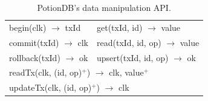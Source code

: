 \documentclass[sigplan,review,anonymous]{acmart}
\newcommand{\code}[1]{\textsf{\small{#1}}}
\begin{document}
\begin{small}
\begin{table}[t]
\center
	\begin{tabular}{ll} 
		\toprule
		 \code{begin(clk) $\rightarrow$ txId}                    & \code{get(txId, id) $\rightarrow$ value}            \\
		 \code{commit(txId) $\rightarrow$ clk}            & \code{read(txId, id, op) $\rightarrow$ value}          \\
		  \code{rollback(txId) $\rightarrow$ ok}        & \code{upsert(txId, id, op) $\rightarrow$ ok}                        \\[4pt]
		\multicolumn{2}{l}{\code{readTx(clk, (id, op)$^+$) $\rightarrow$ clk, value$^+$}} \\
		\multicolumn{2}{l}{\code{updateTx(clk, (id, op)$^+$) $\rightarrow$ clk}} \\
		\bottomrule
	\end{tabular}
	\vspace{0.8em}
	\caption{PotionDB's data manipulation API.}
	\label{table:PotionDB_API}
\end{table}
\end{small}
\end{document}
